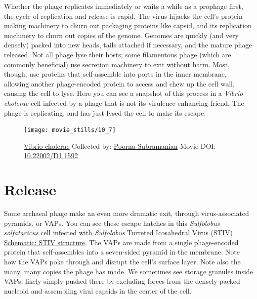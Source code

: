 \documentclass[]{tufte-book}
\begin{document}
Whether the phage replicates immediately or waits a while as a prophage
first, the cycle of replication and release is rapid. The virus hijacks
the cell's protein-making machinery to churn out packaging proteins like
capsid, and its replication machinery to churn out copies of the genome.
Genomes are quickly (and very densely) packed into new heads, tails
attached if necessary, and the mature phage released. Not all phage lyse
their hosts; some filamentous phage (which are commonly beneficial) use
secretion machinery to exit without harm. Most, though, use proteins
that self-assemble into ports in the inner membrane, allowing another
phage-encoded protein to access and chew up the cell wall, causing the
cell to lyse. Here you can see a snapshot of this process in a
\emph{Vibrio cholerae} cell infected by a phage that is not its
virulence-enhancing friend. The phage is replicating, and has just lysed
the cell to make its escape.





\begin{figure}
\texttt{[image: movie\_stills/10\_7]} \caption[\protect\hyperlink{tree}{Vibrio cholerae} Collected by:
\protect\hyperlink{poorna_subramanian}{Poorna Subramanian} Movie DOI:
\href{https://doi.org/10.22002/D1.1592}{10.22002/D1.1592}]{\protect\hyperlink{tree}{Vibrio cholerae} Collected by:
\protect\hyperlink{poorna_subramanian}{Poorna Subramanian} Movie DOI:
\href{https://doi.org/10.22002/D1.1592}{10.22002/D1.1592}}\label{fig:10-7}
\end{figure}

\section{Release}\label{release}

Some archaeal phage make an even more dramatic exit, through
virus-associated pyramids, or VAPs. You can see these escape hatches in
this \emph{Sulfolobus solfataricus} cell infected with \emph{Sulfolobus}
Turreted Icosahedral Virus (STIV)
\protect\hyperlink{STIV_structure}{Schematic: STIV structure}. The VAPs
are made from a single phage-encoded protein that self-assembles into a
seven-sided pyramid in the membrane. Note how the VAPs poke through and
disrupt the cell's surface layer. Note also the many, many copies the
phage has made. We sometimes see storage granules inside VAPs, likely
simply pushed there by excluding forces from the densely-packed nucleoid
and assembling viral capsids in the center of the cell.
\end{document}
